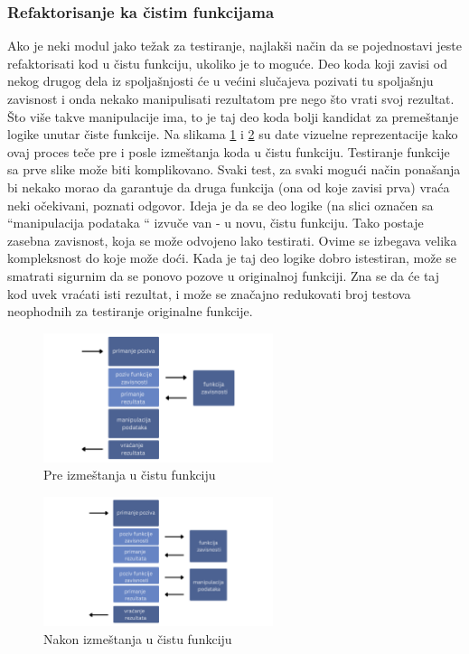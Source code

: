 \documentclass[12pt,oneside]{memoir}
\begin{document}
\subsubsection{Refaktorisanje ka čistim funkcijama} 
Ako je neki modul jako težak za testiranje, najlakši način da se pojednostavi jeste refaktorisati kod u čistu funkciju, ukoliko je to moguće. Deo koda koji zavisi od nekog drugog dela iz spoljašnjosti će u većini slučajeva pozivati tu spoljašnju zavisnost i onda nekako manipulisati rezultatom pre nego što vrati svoj rezultat. Što više takve manipulacije ima, to je taj deo koda bolji kandidat za premeštanje logike unutar čiste funkcije. Na slikama \ref{fig:dep1} i \ref{fig:dep2} su date vizuelne reprezentacije kako ovaj proces teče pre i posle izmeštanja koda u čistu funkciju. 
Testiranje funkcije sa prve slike može biti komplikovano. Svaki test, za svaki mogući način ponašanja bi nekako morao da garantuje da druga funkcija (ona od koje zavisi prva) vraća neki očekivani, poznati odgovor. Ideja je da se deo logike (na slici označen sa ``manipulacija podataka `` izvuče van - u novu, čistu funkciju. Tako postaje zasebna zavisnost, koja se može odvojeno lako testirati. Ovime se izbegava velika kompleksnost do koje može doći. Kada je taj deo logike dobro istestiran, može se smatrati sigurnim da se ponovo pozove u originalnoj funkciji. Zna se da će taj kod uvek vraćati isti rezultat, i može se značajno redukovati broj testova neophodnih za testiranje originalne funkcije.

\begin{figure}[!ht]
  \centering
  \label{fig:dep1}
  \includegraphics[width=0.6\textwidth]{dep1.png}
  \caption{Pre izmeštanja u čistu funkciju}
\end{figure}

\begin{figure}[!ht]
  \centering
  \label{fig:dep2}
  \includegraphics[width=0.6\textwidth]{dep2.png}
  \caption{Nakon izmeštanja u čistu funkciju}
\end{figure}
\end{document}
